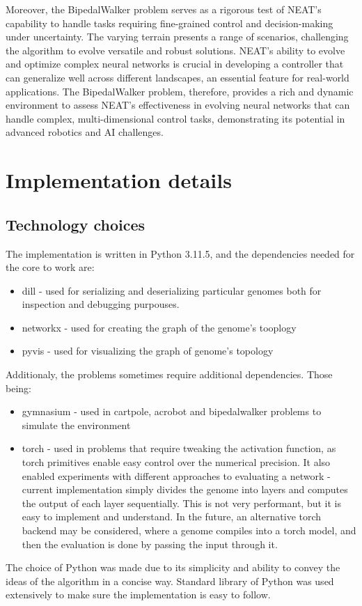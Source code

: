 \documentclass{article}
\begin{document}
        Moreover, the BipedalWalker problem serves as a rigorous test of NEAT's capability to handle tasks requiring fine-grained
        control and decision-making under uncertainty. The varying terrain presents a range of scenarios,
        challenging the algorithm to evolve versatile and robust solutions. NEAT's ability to evolve and optimize
        complex neural networks is crucial in developing a controller that can generalize well across different landscapes,
        an essential feature for real-world applications. The BipedalWalker problem, therefore,
        provides a rich and dynamic environment to assess NEAT's effectiveness in evolving neural networks that can handle complex,
        multi-dimensional control tasks, demonstrating its potential in advanced robotics and AI challenges.

    \section{Implementation details}
        \subsection{Technology choices}
        The implementation is written in Python 3.11.5, and the dependencies needed for the core to work are:
        \begin{itemize}
            \item dill - used for serializing and deserializing particular genomes both for inspection and debugging purpouses. 
            \item networkx - used for creating the graph of the genome's tooplogy 
            \item pyvis - used for visualizing the graph of genome's topology
        \end{itemize}
        Additionaly, the problems sometimes require additional dependencies. Those being:
        \begin{itemize}
            \item gymnasium \cite{gymnasium} - used in cartpole, acrobot and bipedalwalker problems to simulate the environment
            \item torch \cite{Pytorch} - used in problems that require tweaking the activation function, as torch primitives enable easy control over the numerical precision. 
                It also enabled experiments with different approaches to evaluating a network - current implementation simply divides the genome into layers and 
                computes the output of each layer sequentially. This is not very performant, but it is easy to implement and understand. In the future,
                an alternative torch backend may be considered, where a genome compiles into a torch model, and then the evaluation is done by passing the input
                through it.
        \end{itemize}
        The choice of Python was made due to its simplicity and ability to convey the ideas of the algorithm in a concise way.
        Standard library of Python was used extensively to make sure the implementation is easy to follow.
\end{document}
